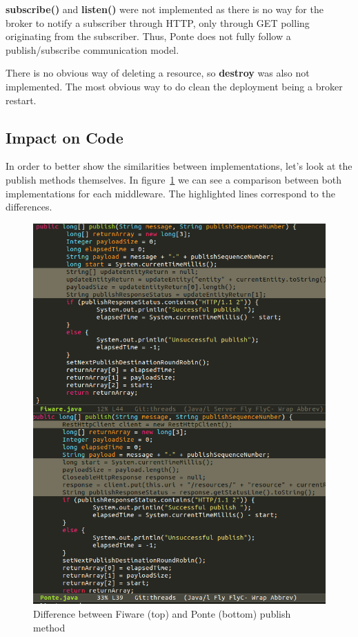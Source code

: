 \documentclass[conference]{IEEEtran}
\begin{document}
\textbf{subscribe()} and \textbf{listen()} were not implemented as there is no way for the broker to notify a subscriber through HTTP, only through GET polling originating from the subscriber. Thus, Ponte does not fully follow a  publish/subscribe communication model.

There is no obvious way of deleting a resource, so \textbf{destroy} was also not implemented. The most obvious way to do clean the deployment being a broker restart. 

\subsection{Impact on Code}

In order to better show the similarities between implementations, let's look at the publish methods themselves. In figure~\ref{fig:fiware_ponte_diff} we can see a comparison between both implementations for each middleware. The highlighted lines correspond to the differences.

\begin{figure}[htbp!]
  \centering
  \includegraphics[width=\columnwidth]{figures/fiware_ponte_diff.png}
  \caption{Difference between Fiware (top) and Ponte (bottom) publish method}
  \label{fig:fiware_ponte_diff}
\end{figure}
\end{document}
